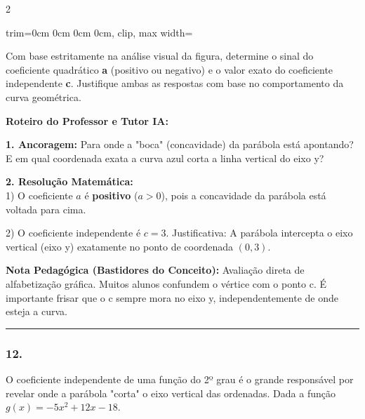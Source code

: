 \begin{multicols*}{2}
\begin{enunciadoLiteral}
\begin{center}
\begin{adjustbox}{trim=0cm 0cm 0cm 0cm, clip, max width=\larguraTikz}
\begin{tikzpicture}
\end{tikzpicture}
\end{adjustbox}
\end{center}

Com base estritamente na análise visual da figura, determine o sinal do coeficiente quadrático \textbf{a} (positivo ou negativo) e o valor exato do coeficiente independente \textbf{c}. Justifique ambas as respostas com base no comportamento da curva geométrica.
\end{enunciadoLiteral}

\ifgabarito
    \begin{tcolorbox}[colback=CorTitUm!5, colframe=CorTitUm, boxrule=1pt, arc=4pt, left=6pt, right=6pt, top=6pt, bottom=6pt]
    \small\textbf{\textcolor{CorTitUm}{Roteiro do Professor e Tutor IA:}}\par\vspace{0.1cm}
    \color{CinzaEscuro}
    \textbf{1. Ancoragem:} Para onde a "boca" (concavidade) da parábola está apontando? E em qual coordenada exata a curva azul corta a linha vertical do eixo y?\par\vspace{0.1cm}
    \textbf{2. Resolução Matemática:}\\
    1) O coeficiente $a$ é \textbf{positivo} ($a > 0$), pois a concavidade da parábola está voltada para cima.
    
    2) O coeficiente independente é $c = 3$. 
    Justificativa: A parábola intercepta o eixo vertical (eixo y) exatamente no ponto de coordenada $(0, 3)$.
    \end{tcolorbox}
    \vspace{0.15cm}
    
    \begin{boxexplicacao}
    \textbf{Nota Pedagógica (Bastidores do Conceito):} Avaliação direta de alfabetização gráfica. Muitos alunos confundem o vértice com o ponto c. É importante frisar que o c sempre mora no eixo y, independentemente de onde esteja a curva.
    \end{boxexplicacao}
\fi

\par\vspace{\espacoQuestao}

\noindent\textcolor{CorLinha}{\rule{\linewidth}{0.5pt}} 
\par\vspace{\espacoPreQuestao}
\subsubsection*{12.} 
\begin{enunciadoLiteral}
O coeficiente independente de uma função do 2º grau é o grande responsável por revelar onde a parábola "corta" o eixo vertical das ordenadas. Dada a função $g(x) = -5x^2 + 12x - 18$.


\end{enunciadoLiteral}
\end{multicols*}
